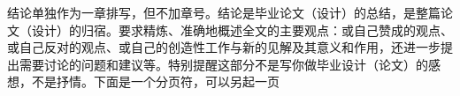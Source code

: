 \Conclusion
结论单独作为一章排写，但不加章号。结论是毕业论文（设计）的总结，是整篇论文（设计）的归宿。要求精炼、准确地概述全文的主要观点：或自己赞成的观点、或自己反对的观点、或自己的创造性工作与新的见解及其意义和作用，还进一步提出需要讨论的问题和建议等。特别提醒这部分不是写你做毕业设计（论文）的感想，不是抒情。下面是一个分页符，可以另起一页